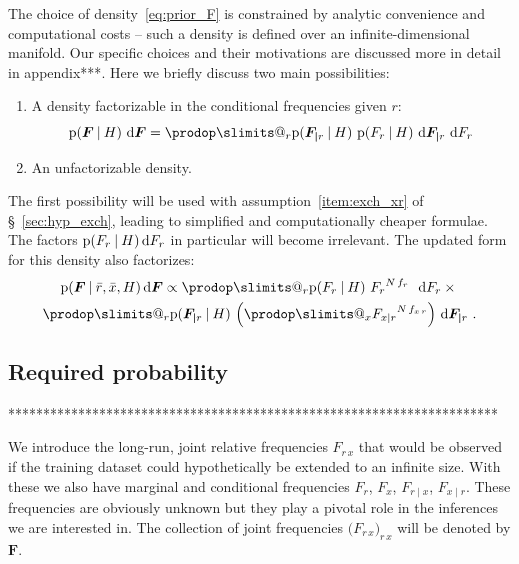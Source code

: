 \documentclass[\ifafour a4paper,12pt,\else a5paper,10pt,\fi%
onecolumn,oneside,article,%
british%
]{memoir}
\makeatletter
\theoremstyle{remark}
\theoremstyle{innote}
\def\prod{\DOTSI\prodop\slimits@}
\newcommand*{\di}{\mathrm{d}}%
\newcommand*{\p}{\mathrm{p}}%
\renewcommand*{\|}[1][]{\nonscript\:#1\vert\nonscript\:\mathopen{}}
\renewcommand*{\=}{\TextOrMath\texteq\eq}
\newcommand*{\sect}{\S}%
\newcommand*{\wrench}{{\fontencoding{U}\fontfamily{fontawesomethree}\selectfont\symbol{114}}}
\newcommand{\mynote}[1]{ {\color{notecolour}#1}}
\newcommand*{\q}{}%
\DeclareRobustCommand*{\q}{%
  \mathord{\mathpalette\bigcdot@{}}%
}
\newcommand*{\bigcdot@scalefactor}{0.7}
\newcommand*{\bigcdot@widthfactor}{1.5}
\newcommand*{\bigcdot@}[2]{%
  \sbox0{$#1\vcenter{}$}%
  \sbox2{$#1\cdot\m@th$}%
  \hbox to \bigcdot@widthfactor\wd2{%
    \hfil
    \raise\ht0\hbox{%
      \scalebox{\bigcdot@scalefactor}{%
        \lower\ht0\hbox{$#1\bullet\m@th$}%
      }%
    }%
    \hfil
  }%
}
\newcommand*{\rd}{\bar{r}}
\newcommand*{\xd}{\bar{x}}
\newcommand*{\yF}{\bm{F}}
\newcommand*{\yFr}{\yF_{\bm{\mid}r}}
\makeatother
\begin{document}
The choice of density~\eqref{eq:prior_F} is constrained by analytic
convenience and computational costs -- such a density is defined over an
infinite-dimensional manifold. Our specific choices and their motivations are
discussed more in detail in \mynote{\wrench appendix***}. Here we briefly
discuss two main possibilities:
\begin{enumerate}[label=\Roman*.]
\item\label{item:p_F_factorizable} A density factorizable in the
  conditional frequencies given $r$:
  \begin{equation}
    \label{eq:p_F_factorizable}
    \p(\yF\| H)\ \di\yF =
    \prod_{r} \p(\yFr \| H)\ \p(F_{r\q} \| H)\ \di\yFr\ \di F_{r\q}
  \end{equation}

\item\label{item:p_F_unfactorizable} An unfactorizable density.
\end{enumerate}
The first possibility will be used with assumption~\ref{item:exch_xr} of
\sect~\ref{sec:hyp_exch}, leading to simplified and computationally cheaper
formulae. The factors $\p(F_{r\q} \| H)\,\di F_{r\q}$ in particular will
become irrelevant. The updated form for this density also factorizes:
  \begin{multline}
  \label{eq:post_prob_F_factorizable}
  \p(\yF\|\rd,\xd, H)\,\di\yF \propto
  \prod_{r} \p(F_{r\q} \| H)\ {F_{r\q}}^{N\,f_{r\q}}\ \ \di F_{r\q} \times{}\\
  \prod_{r} \p(\yFr \| H)\
  \Bigl(\prod_{x} {F_{x\mid r}}^{N\,f_{x\,r}}\Bigr)\ \di\yFr \ .
\end{multline}



\subsection{Required probability}
\label{sec:p_final_inference}




**********************************************************************



We introduce the long-run, joint relative frequencies $F_{r\,x}$ that would
be observed if the training dataset could hypothetically be extended to an
infinite size. With these we also have
marginal and conditional frequencies $F_{r\q}$, $F_{\q x}$, $F_{r\mid x}$,
$F_{x \mid r}$. These frequencies are obviously unknown but they play a
pivotal role in the inferences we are interested in. The collection of
joint frequencies $\bigl(F_{r\,x}\bigr)_{r\,x}$ will be denoted by $\yF$.
\end{document}
